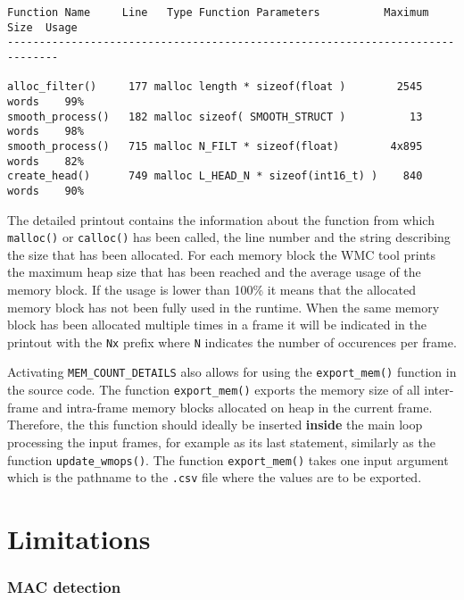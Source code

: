 \begin{Verbatim}[fontsize=\small]
Function Name     Line   Type Function Parameters          Maximum Size  Usage
------------------------------------------------------------------------------

alloc_filter()     177 malloc length * sizeof(float )        2545 words    99%
smooth_process()   182 malloc sizeof( SMOOTH_STRUCT )          13 words    98%
smooth_process()   715 malloc N_FILT * sizeof(float)        4x895 words    82%
create_head()      749 malloc L_HEAD_N * sizeof(int16_t) )    840 words    90%
\end{Verbatim}

The detailed printout contains the information about the function from which \verb|malloc()| or \verb|calloc()| has been called, the line number and the string describing the size that has been allocated. For each memory block the WMC tool prints the maximum heap size that has been reached and the average usage of the memory block. If the usage is lower than 100\% it means that the allocated memory block has not been fully used in the runtime. When the same memory block has been allocated multiple times in a frame it will be indicated in the printout with the \verb|Nx| prefix where \verb|N| indicates the number of occurences per frame.

Activating \verb|MEM_COUNT_DETAILS| also allows for using the \verb|export_mem()| function in the source code. The function \verb|export_mem()| exports the memory size of all inter-frame and intra-frame memory blocks allocated on heap in the current frame. Therefore, the this function should ideally be inserted \textbf{inside} the main loop processing the input frames, for example as its last statement, similarly as the function \verb|update_wmops()|. The function \verb|export_mem()| takes one input argument which is the pathname to the \verb|.csv| file where the values are to be exported. 


\section{Limitations}
\label{ch:limitations}

\subsubsection{MAC detection}

